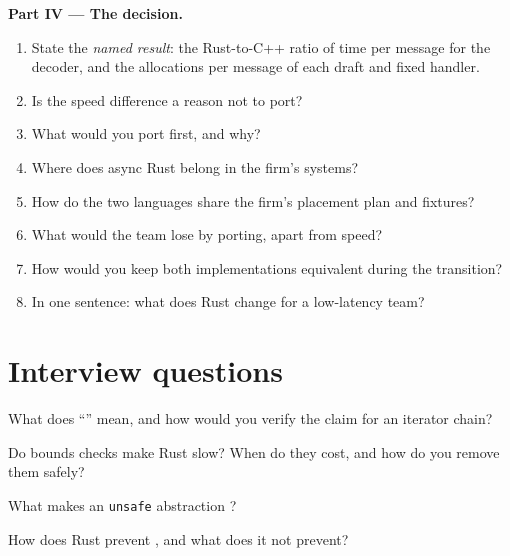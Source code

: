 \begin{problem}
\medskip\noindent\textbf{Part IV --- The decision.}
\begin{enumerate}[resume]
\item State the \emph{named result}: the Rust-to-C++ ratio of time per message for the decoder, and the allocations per
message of each draft and fixed handler.
\item Is the speed difference a reason not to port?
\item What would you port first, and why?
\item Where does async Rust belong in the firm's systems?
\item How do the two languages share the firm's placement plan and fixtures?
\item What would the team lose by porting, apart from speed?
\item How would you keep both implementations equivalent during the transition?
\item In one sentence: what does Rust change for a low-latency team?
\end{enumerate}
\end{problem}

\section{Interview questions}

\begin{interviewq}\label{iq:ll:rust-for-low-latency:1}
What does ``'' mean, and how would you verify the claim for an iterator chain?
\end{interviewq}

\begin{interviewq}\label{iq:ll:rust-for-low-latency:2}
Do bounds checks make Rust slow? When do they cost, and how do you remove them safely?
\end{interviewq}

\begin{interviewq}\label{iq:ll:rust-for-low-latency:3}
What makes an \texttt{unsafe} abstraction ?
\end{interviewq}

\begin{interviewq}\label{iq:ll:rust-for-low-latency:4}
How does Rust prevent , and what does it not prevent?
\end{interviewq}

